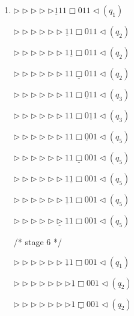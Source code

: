 \documentclass[12pt,a4paper]{article}
\makeatletter
\newtheorem*{solution}{Solution}
\theoremstyle{definition}
\renewenvironment{solution}[1][Solution] {\par\pushQED{\qed}\normalfont\topsep6\p@\@plus6\p@\relax\trivlist\item[\hskip\labelsep\bfseries#1\@addpunct{.}]\ignorespaces}{\popQED\endtrivlist\@endpefalse} \makeatother
\makeatother
\begin{document}
\begin{enumerate}
\begin{solution}
\begin{minipage}{0.3\textwidth}
		$\triangleright\triangleright\triangleright\triangleright\triangleright\underline{1}11\Box011\triangleleft(q_1)$
		
		$\triangleright\triangleright\triangleright\triangleright\triangleright\triangleright\underline{1}1\Box011\triangleleft(q_2)$
		
		$\triangleright\triangleright\triangleright\triangleright\triangleright\triangleright1\underline{1}\Box011\triangleleft(q_2)$
		
		$\triangleright\triangleright\triangleright\triangleright\triangleright\triangleright11\underline{\Box}011\triangleleft(q_2)$
		
		$\triangleright\triangleright\triangleright\triangleright\triangleright\triangleright11\Box\underline{0}11\triangleleft(q_3)$
		
		$\triangleright\triangleright\triangleright\triangleright\triangleright\triangleright11\Box0\underline{1}1\triangleleft(q_3)$
		
		$\triangleright\triangleright\triangleright\triangleright\triangleright\triangleright11\Box\underline{0}01\triangleleft(q_5)$
		
		$\triangleright\triangleright\triangleright\triangleright\triangleright\triangleright11\underline{\Box}001\triangleleft(q_5)$
		
		$\triangleright\triangleright\triangleright\triangleright\triangleright\triangleright1\underline{1}\Box001\triangleleft(q_5)$
		
		$\triangleright\triangleright\triangleright\triangleright\triangleright\triangleright\underline{1}1\Box001\triangleleft(q_5)$
		
		$\triangleright\triangleright\triangleright\triangleright\triangleright\underline{\triangleright}11\Box001\triangleleft(q_5)$
		
	\end{minipage}
	\newpage
	\begin{minipage}{0.3\textwidth}
		\centering
		/* stage 6 */
		
		$\triangleright\triangleright\triangleright\triangleright\triangleright\triangleright\underline{1}1\Box001\triangleleft(q_1)$
		
		$\triangleright\triangleright\triangleright\triangleright\triangleright\triangleright\triangleright\underline{1}\Box001\triangleleft(q_2)$
		
		$\triangleright\triangleright\triangleright\triangleright\triangleright\triangleright\triangleright1\underline{\Box}001\triangleleft(q_2)$
		

\end{minipage}
\end{solution}
\end{enumerate}
\end{document}
